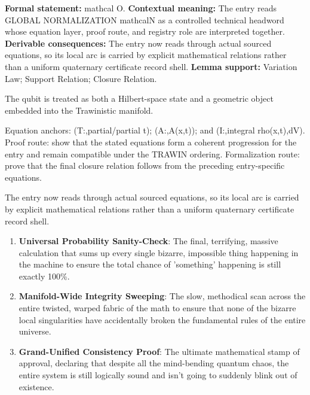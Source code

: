 \begingroup\footnotesize\setlength{\emergencystretch}{3em}\sloppy
\textbf{Formal statement:} mathcal O. \textbf{Contextual meaning:} The entry reads GLOBAL NORMALIZATION mathcalN as a controlled technical headword whose equation layer, proof route, and registry role are interpreted together. \textbf{Derivable consequences:} The entry now reads through actual sourced equations, so its local arc is carried by explicit mathematical relations rather than a uniform quaternary certificate record shell. \textbf{Lemma support:} Variation Law; Support Relation; Closure Relation.\par
\endgroup

The qubit is treated as both a Hilbert-space state and a geometric object embedded into the Trawinistic manifold.

Equation anchors: (T:,partial/partial t); (A:,A(x,t)); and (I:,integral rho(x,t),dV). Proof route: show that the stated equations form a coherent progression for the entry and remain compatible under the TRAWIN ordering. Formalization route: prove that the final closure relation follows from the preceding entry-specific equations.

The entry now reads through actual sourced equations, so its local arc is carried by explicit mathematical relations rather than a uniform quaternary certificate record shell.
\endgroup

\begin{enumerate}[leftmargin=1.6em,itemsep=6pt,topsep=4pt]
\item \textbf{Universal Probability Sanity-Check}: The final, terrifying, massive calculation that sums up every single bizarre, impossible thing happening in the machine to ensure the total chance of 'something' happening is still exactly 100\%.
\item \textbf{Manifold-Wide Integrity Sweeping}: The slow, methodical scan across the entire twisted, warped fabric of the math to ensure that none of the bizarre local singularities have accidentally broken the fundamental rules of the entire universe.
\item \textbf{Grand-Unified Consistency Proof}: The ultimate mathematical stamp of approval, declaring that despite all the mind-bending quantum chaos, the entire system is still logically sound and isn't going to suddenly blink out of existence.
\end{enumerate}


